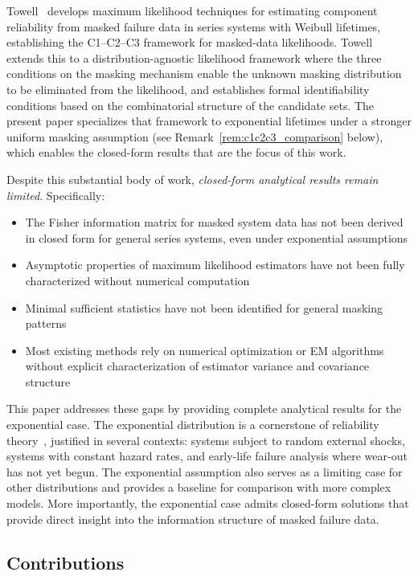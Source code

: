 \documentclass[pdflatex,sn-mathphys-num,Numbered]{sn-jnl}
\theoremstyle{thmstyleone}
\theoremstyle{thmstylethree}
\theoremstyle{thmstyletwo}
\begin{document}
Towell~\cite{towell2023reliability} develops maximum likelihood techniques for estimating component reliability from masked failure data in series systems with Weibull lifetimes, establishing the C1--C2--C3 framework for masked-data likelihoods. Towell~\cite{towell2025masked} extends this to a distribution-agnostic likelihood framework where the three conditions on the masking mechanism enable the unknown masking distribution to be eliminated from the likelihood, and establishes formal identifiability conditions based on the combinatorial structure of the candidate sets. The present paper specializes that framework to exponential lifetimes under a stronger uniform masking assumption (see Remark~\ref{rem:c1c2c3_comparison} below), which enables the closed-form results that are the focus of this work.

Despite this substantial body of work, \emph{closed-form analytical results remain limited}. Specifically:
\begin{itemize}
\item The Fisher information matrix for masked system data has not been derived in closed form for general series systems, even under exponential assumptions
\item Asymptotic properties of maximum likelihood estimators have not been fully characterized without numerical computation
\item Minimal sufficient statistics have not been identified for general masking patterns
\item Most existing methods rely on numerical optimization or EM algorithms without explicit characterization of estimator variance and covariance structure
\end{itemize}

This paper addresses these gaps by providing complete analytical results for the exponential case. The exponential distribution is a cornerstone of reliability theory~\cite{barlow1975}, justified in several contexts: systems subject to random external shocks, systems with constant hazard rates, and early-life failure analysis where wear-out has not yet begun. The exponential assumption also serves as a limiting case for other distributions and provides a baseline for comparison with more complex models. More importantly, the exponential case admits closed-form solutions that provide direct insight into the information structure of masked failure data.

\subsection{Contributions}
\end{document}
